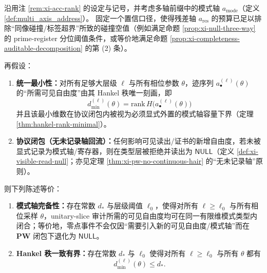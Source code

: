 \begin{theorem}\label{thm:xi-completeness-iff-hankel-bounded}
沿用注 \ref{rem:xi-acc-rank} 的设定与记号，并考虑多轴前缀中的模式轴 \(a_{\mathrm{mode}}\)（定义 \ref{def:multi_axis_address}）。
固定一个置信口径，使得残差轴 \(a_{\mathrm{res}}\) 的预算已足以排除“同像碰撞/标签超界”所致的碰撞空值（例如满足命题 \ref{prop:xi-null-three-way} 的 prime-register 分位阈值条件，或等价地满足命题 \ref{prop:xi-completeness-auditable-decomposition} 的第 (2) 条）。
\par
再假设：
\begin{enumerate}
  \item \textbf{统一最小性：}对所有足够大层级 \(\ell\) 与所有相位参数 \(\theta\)，迹序列 \(a^{(\ell)}_\bullet(\theta)\) 的“所需可见自由度”由其 Hankel 秩唯一刻画，即
  \[
  d^{(\ell)}_{\min}(\theta)=\mathrm{rank}\,H\!\bigl(a^{(\ell)}_\bullet(\theta)\bigr)
  \]
  并且该最小维数在协议闭包内被视为必须显式外置的模式轴容量下界（定理 \ref{thm:hankel-rank-minimal}）。
  \item \textbf{协议闭包（无未记录轴回流）：}任何影响可见读出/证书的新增自由度，若未被显式记录为模式轴/寄存器，则在类型层被拒绝并读出为 \(\mathsf{NULL}\)（定义 \ref{def:xi-visible-read-null}；亦见定理 \ref{thm:xi-pw-no-continuous-hair} 的“无未记录轴”原则）。
\end{enumerate}
则下列陈述等价：
\begin{enumerate}
  \item[(i)] \textbf{模式轴完备性：}存在常数 \(d_\ast\) 与层级阈值 \(\ell_0\)，使得对所有 \(\ell\ge \ell_0\) 与所有相位采样 \(\theta\)，unitary-slice 审计所需的可见自由度均可在同一有限维模式类型内闭合；等价地，零点事件不会仅因“需要引入新的可见自由度/模式轴”而在 \(\mathbf{PW}\) 闭包下退化为 \(\mathsf{NULL}\)。
  \item[(ii)] \textbf{Hankel 秩一致有界：}存在常数 \(d_\ast\) 与 \(\ell_0\) 使得对所有 \(\ell\ge \ell_0\) 与所有 \(\theta\) 都有
  \[
  d^{(\ell)}_{\min}(\theta)\le d_\ast.
  \]
\end{enumerate}
\end{theorem}


